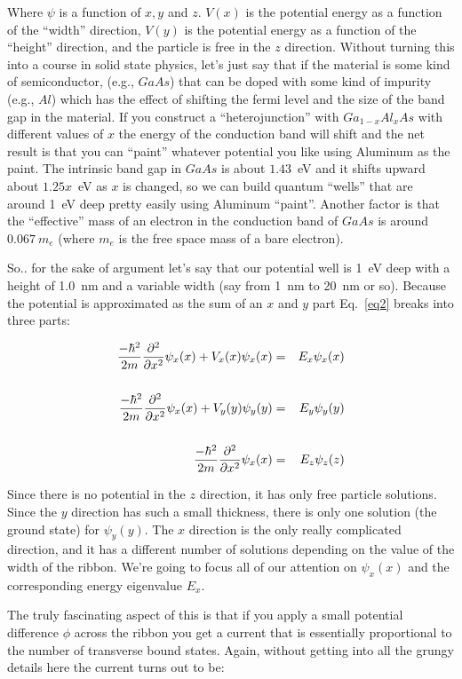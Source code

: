 \documentclass[11pt]{article} %
\begin{document}
Where $\psi$ is a function of $x, y$ and $z$. $V(x)$ is the potential energy as a function of the ``width'' direction, $V(y)$ is the potential energy as a function of the ``height'' direction, and the particle is free in the $z$ direction. Without turning this into a course in solid state physics, let's just say that if the material is some kind of semiconductor, (e.g., $GaAs$) that can be doped with some kind of impurity (e.g., $Al$) which has the effect of shifting the fermi level and the size of the band gap in the material. If you construct a ``heterojunction'' with $Ga_{1-x} Al_x As$ with different values of $x$ the energy of the conduction band will shift and the net result is that you can ``paint'' whatever potential you like using Aluminum as the paint. The intrinsic band gap in $GaAs$ is about $1.43$~eV and it shifts upward about $1.25x$~eV as $x$ is changed, so we can build quantum ``wells'' that are around 1~eV deep pretty easily using Aluminum ``paint''. Another factor is that the ``effective'' mass of an electron in the conduction band of $GaAs$ is around $0.067~m_e$ (where $m_e$ is the free space mass of a bare electron). 

So.. for the sake of argument let's say that our potential well is 1~eV deep with a height of 1.0~nm and a variable width (say from 1~nm to 20~nm or so). Because the potential is approximated as the sum of an $x$ and $y$ part Eq.~\ref{eq2} breaks into three parts:

\begin{eqnarray*}
\frac{-\hbar^2}{2m}\frac{\partial^2}{\partial x^2}\psi_x(x) + V_x(x)\psi_x(x) & = & E_x\psi_x(x)\cr
\cr
\frac{-\hbar^2}{2m}\frac{\partial^2}{\partial x^2}\psi_x(x) + V_y(y)\psi_y(y) & = & E_y\psi_y(y)\cr
\cr
\frac{-\hbar^2}{2m}\frac{\partial^2}{\partial x^2}\psi_x(x) & = & E_z\psi_z(z)\cr
\label{eq3}
\end{eqnarray*}

Since there is no potential in the $z$ direction, it has only free particle solutions. Since the $y$ direction has such a small thickness, there is only one solution (the ground state) for $\psi_y(y)$. The $x$ direction is the only really complicated direction, and it has a different number of solutions depending on the value of the width of the ribbon. We're going to focus all of our attention on $\psi_x(x)$ and the corresponding energy eigenvalue $E_x$.

The truly fascinating aspect of this is that if you apply a small potential difference $\phi$ across the ribbon you get a current that is essentially proportional to the number of transverse bound states. Again, without getting into all the grungy details here the current turns out to be:
\end{document}
